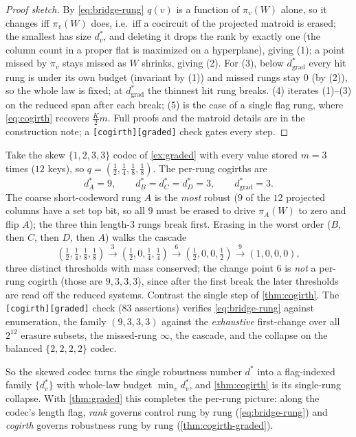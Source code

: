 \documentclass[acmsmall,review]{acmart}
\newcommand{\W}{W}                          %
\newcommand{\proj}{\pi}                     %
\begin{document}
\begin{proof}[Proof sketch]
By \eqref{eq:bridge-rung} $q(v)$ is a function of $\proj_v(\W)$ alone, so it changes iff
$\proj_v(\W)$ does, i.e.\ iff a cocircuit of the projected matroid is erased; the smallest
has size $d^\ast_v$, and deleting it drops the rank by exactly one (the column count in a
proper flat is maximized on a hyperplane), giving (1); a point missed by $\proj_v$ stays
missed as $\W$ shrinks, giving (2). For (3), below $d^\ast_{\mathrm{grad}}$ every hit rung is
under its own budget (invariant by (1)) and missed rungs stay $0$ (by (2)), so the whole law
is fixed; at $d^\ast_{\mathrm{grad}}$ the thinnest hit rung breaks. (4) iterates (1)--(3) on
the reduced span after each break; (5) is the case of a single flag rung, where
\eqref{eq:cogirth} recovers $\tfrac{K}{2}m$. Full proofs and the matroid details are in the
construction note; a \texttt{[cogirth][graded]} check gates every step.
\end{proof}

\begin{example}
\label{ex:cogirth-graded}
Take the skew $\{1,2,3,3\}$ codec of \cref{ex:graded} with every value stored $m = 3$ times
($12$ keys), so $q = (\tfrac12,\tfrac14,\tfrac18,\tfrac18)$. The per-rung cogirths are
\[
  d^\ast_A = 9, \qquad d^\ast_B = d^\ast_C = d^\ast_D = 3, \qquad d^\ast_{\mathrm{grad}} = 3.
\]
The coarse short-codeword rung $A$ is the \emph{most} robust ($9$ of the $12$ projected
columns have a set top bit, so all $9$ must be erased to drive $\proj_A(\W)$ to zero and flip
$A$); the three thin length-$3$
rungs break first. Erasing in the worst order ($B$, then $C$, then $D$, then $A$) walks the
cascade
\[
  (\tfrac12,\tfrac14,\tfrac18,\tfrac18)
  \xrightarrow{\;3\;} (\tfrac12, 0, \tfrac14, \tfrac14)
  \xrightarrow{\;6\;} (\tfrac12, 0, 0, \tfrac12)
  \xrightarrow{\;9\;} (1, 0, 0, 0),
\]
three distinct thresholds with mass conserved; the change point $6$ is \emph{not} a per-rung
cogirth (those are $9,3,3,3$), since after the first break the later thresholds are read off
the reduced systems. Contrast the single step of \cref{thm:cogirth}. The
\texttt{[cogirth][graded]} check ($83$ assertions) verifies \eqref{eq:bridge-rung} against
enumeration, the family $(9,3,3,3)$ against the \emph{exhaustive} first-change over all
$2^{12}$ erasure subsets, the missed-rung $\infty$, the cascade, and the collapse on the
balanced $\{2,2,2,2\}$ codec.
\end{example}

So the skewed codec turns the single robustness number $d^\ast$ into a flag-indexed family
$\{d^\ast_v\}$ with whole-law budget $\min_v d^\ast_v$, and \cref{thm:cogirth} is its
single-rung collapse. With \cref{thm:graded} this completes the per-rung picture: along the
codec's length flag, \emph{rank} governs control rung by rung (\eqref{eq:bridge-rung}) and
\emph{cogirth} governs robustness rung by rung (\cref{thm:cogirth-graded}).
\end{document}
